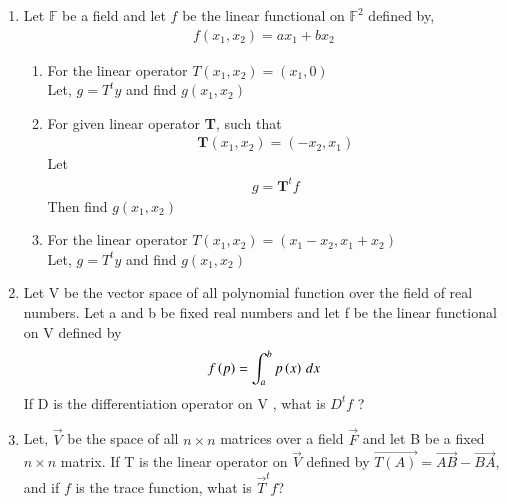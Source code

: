 \renewcommand{\theequation}{\theenumi}
\renewcommand{\thefigure}{\theenumi}
\begin{enumerate}[label=\thesubsection.\arabic*.,ref=\thesubsection.\theenumi]

\item Let $\mathbb{F}$ be a field and let $f$ be the linear functional on $\mathbb{F}^2$ defined by,
\begin{align}
f(x_1,x_2) = ax_1+bx_2
\end{align}
\begin{enumerate}
\item For the linear operator $T(x_1,x_2) = (x_1,0)$\\
Let, $g = T^ty$ and find $g(x_1,x_2)$
%
\\
\solution

\item For given linear operator  \textbf{T}, such that
\begin{align}
\textbf{T}(x_1, x_2) = (-x_2, x_1)  \label{eq:solutions/3/7/1/b/1.2}
\end{align}
Let 
\begin{align}
g = \textbf{T}^{t} f
\end{align}
Then find $g(x_1, x_2)$
%
\\
\solution

\item For the linear operator $T(x_1,x_2) = (x_1-x_2,x_1+x_2)$\\
Let, $g = T^ty$ and find $g(x_1,x_2)$
\\
\solution

\end{enumerate}
%
\item Let V be the vector space of all polynomial function over the field of real numbers. Let a and b be fixed real numbers and let f be the linear functional on V defined by  
\begin{align}
    f\left(p\right) = \int_{a}^{b} p\left(x\right) \,dx
\end{align}
If D is the differentiation operator on V , what is $D^{t}f$ ?
%
\\
\solution

\item Let, $\vec{V}$ be the space of all $n \times n$ matrices over a field $\vec{F}$ and let B be a fixed $n \times n$ matrix. If T is the linear operator on $\vec{V}$ defined by $\vec{T(A)} = \vec{AB} - \vec{BA}$, and if $f$ is the trace function, what is $\vec{T}^tf$? 

\end{enumerate}
